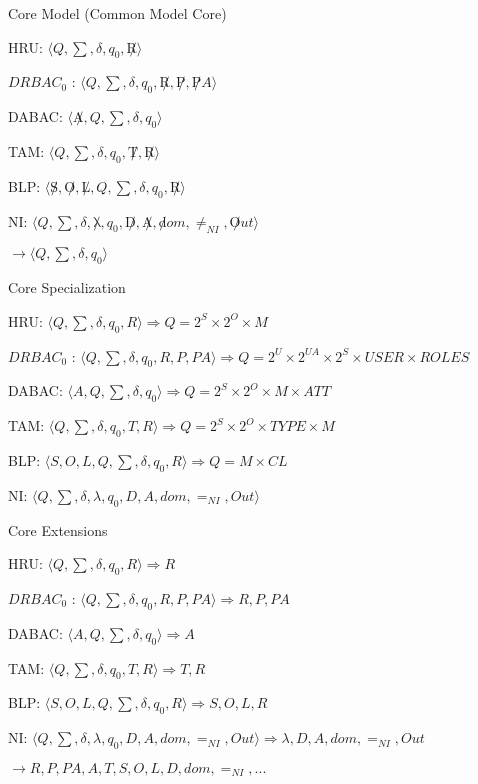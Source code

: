 \documentclass[a4paper]{article}
\begin{document}
\begin{multicols}{3}
    Core Model (Common Model Core)
    \begin{itemize*}
        \item HRU: $⟨ Q, \sum , \delta, q_0  , \not R ⟩$
        \item $DRBAC_0$ : $⟨ Q, \sum , \delta, q_0  , \not R, \not P, \not PA ⟩$
        \item DABAC: $⟨ \not A , Q ,\sum , \delta, q_0  ⟩$
        \item TAM: $⟨ Q , \sum , \delta, q_0  , \not T, \not R ⟩$
        \item BLP: $⟨ \not S, \not O, \not L, Q , \sum , \delta, q_0  , \not R ⟩$
        \item NI: $⟨ Q , \sum , \delta, \not \lambda ,q_0  , \not D, \not A, \not dom, \not =_{NI} , \not Out ⟩$
        \item $\rightarrow  ⟨ Q ,\sum , \delta, q_0  ⟩$
    \end{itemize*}

    Core Specialization
    \begin{itemize*}
        \item HRU: $⟨ Q, \sum , \delta, q_0  , R ⟩ \Rightarrow Q = 2^S \times  2^O \times M$
        \item $DRBAC_0$ : $⟨ Q, \sum , \delta, q_0  , R, P, PA ⟩ \Rightarrow Q = 2^U\times 2^{UA}\times 2^S \times  USER \times  ROLES$
        \item DABAC: $⟨ A , Q ,\sum , \delta, q_0  ⟩ \Rightarrow Q = 2^S\times 2^O \times M\times ATT$
        \item TAM: $⟨ Q , \sum , \delta, q_0  , T, R ⟩ \Rightarrow Q = 2^S\times 2^O\times TYPE \times M$
        \item BLP: $⟨ S, O, L, Q , \sum , \delta, q_0  , R ⟩ \Rightarrow Q = M \times CL$
        \item NI: $⟨ Q , \sum , \delta, \lambda ,q_0  , D, A, dom, =_{NI} , Out ⟩$
    \end{itemize*}

    Core Extensions
    \begin{itemize*}
        \item HRU: $⟨ Q, \sum , \delta, q_0  , R ⟩ \Rightarrow R$
        \item $DRBAC_0$ : $⟨ Q, \sum , \delta, q_0  , R, P, PA ⟩ \Rightarrow R,P,PA$
        \item DABAC: $⟨ A , Q ,\sum , \delta, q_0  ⟩ \Rightarrow A$
        \item TAM: $⟨ Q , \sum , \delta, q_0  , T, R ⟩ \Rightarrow T,R$
        \item BLP: $⟨ S, O, L, Q , \sum , \delta, q_0  , R ⟩ \Rightarrow S,O,L,R$
        \item NI: $⟨ Q , \sum , \delta, \lambda ,q_0  , D, A, dom, =_{NI} , Out ⟩ \Rightarrow \lambda,D,A,dom,=_{NI},Out$
        \item $\rightarrow R, P, PA, A , T , S , O , L , D , dom , =_{NI} , ...$
    \end{itemize*}


\end{multicols}
\end{document}

